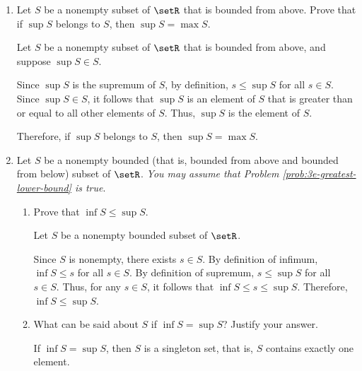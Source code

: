 \begin{enumerate}
\begin{enumerate}
\begin{subprove}
      Therefore, every nonempty set of real numbers that is bounded from below has a greatest lower bound.
    \end{subprove}
  \end{enumerate}










  \newpage
  
  \item Let $S$ be a nonempty subset of $\setR$ that is bounded from above. 
  Prove that if $\sup S$ belongs to $S$, then $\sup S=\max S$.
  \begin{subprove}
    Let $S$ be a nonempty subset of $\setR$ that is bounded from above, and suppose $\sup S \in S$.
    
    Since $\sup S$ is the supremum of $S$, by definition, $s \leq \sup S$ for all $s \in S$.
    Since $\sup S \in S$, it follows that $\sup S$ is an element of $S$ that is greater than or equal to all other elements of $S$.
    Thus, $\sup S$ is the  element of $S$.
    
    Therefore, if $\sup S$ belongs to $S$, then $\sup S = \max S$.
  \end{subprove}





  \item Let $S$ be a nonempty bounded 
  (that is, bounded from above and bounded from below) 
  subset of $\setR$. \textit{You may assume that Problem \ref{prob:3e-greatest-lower-bound} is true}.
  \begin{enumerate}
    \item Prove that $\inf S \leq \sup S$.
    \begin{subprove}
      Let $S$ be a nonempty bounded subset of $\setR$.
      
      Since $S$ is nonempty, there exists $s \in S$.
      By definition of infimum, $\inf S \leq s$ for all $s \in S$.
      By definition of supremum, $s \leq \sup S$ for all $s \in S$.
      Thus, for any $s \in S$, it follows that $\inf S \leq s \leq \sup S$.
      Therefore, $\inf S \leq \sup S$.
    \end{subprove}
    \item What can be said about $S$ if $\inf S=\sup S$? Justify your answer.
    \begin{subanswer}
      If $\inf S = \sup S$, then $S$ is a singleton set, that is, $S$ contains exactly one element.
      

\end{subanswer}
\end{enumerate}
\end{enumerate}
